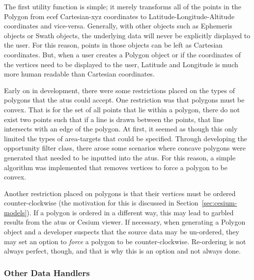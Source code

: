 The first utility function is simple; it merely transforms all of the points in
the Polygon from \acrfull{ecef} Cartesian-xyz coordinates to
Latitude-Longitude-Altitude coordinates and vice-versa.  Generally, with other
objects such as Ephemeris objects or Swath objects, the underlying data will
never be explicitly displayed to the user. For this reason, points in those
objects can be left as Cartesian coordinates. But, when a user creates a
Polygon object or if the coordinates of the vertices need to be displayed to
the user, Latitude and Longitude is much more human readable than Cartesian
coordinates. 

Early on in development, there were some restrictions placed on the types of
polygons that the \glspl{atu} could accept. One restriction was that polygons
must be convex. That is for the set of all points that lie within a polygon,
there do not exist two points such that if a line is drawn between the points,
that line intersects with an edge of the polygon. At first, it seemed as though
this only limited the types of area-targets that could be specified. Through
developing the opportunity filter class, there arose some scenarios where
concave polygons were generated that needed to be inputted into the
\glspl{atu}. For this reason, a simple algorithm was implemented that removes
vertices to force a polygon to be convex.  


Another restriction placed on polygons is that their vertices must be ordered
counter-clockwise (the motivation for this is discussed in
Section~\ref{sec:cesium-models}). If a polygon is ordered in a different way,
this may lead to garbled results from the \glspl{atu} or Cesium viewer. If
necessary, when generating a Polygon object and a developer suspects that the
source data may be un-ordered, they may set an option to \textit{force} a
polygon to be counter-clockwise. Re-ordering is not always perfect, though, and
that is why this is an option and not always done. 



\subsubsection{Other Data Handlers}

